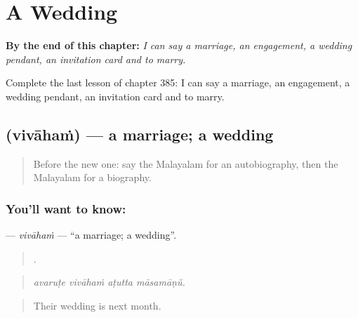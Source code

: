 
\chapter{A Wedding}
\label{ch:ml-a-wedding}

\begin{chapteropening}
\textbf{By the end of this chapter:} \emph{I can say a marriage, an engagement, a wedding pendant, an invitation card and to marry.}

Complete the last lesson of chapter 385: I can say a marriage, an engagement, a wedding pendant, an invitation card and to marry.
\end{chapteropening}

\section[\texorpdfstring{\ml{വിവാഹം} (vivāhaṁ)}{വിവാഹം (vivāhaṁ)}]{ (vivāhaṁ) — a marriage; a wedding}

\label{lesson:ML-C385-vivaham}



\begin{quote}
Before the new one: say the Malayalam for an autobiography, then the Malayalam for a biography.
\end{quote}

\subsection*{You'll want to know: }
\textbf{} — \emph{vivāhaṁ} — \textquotedblleft{}a marriage; a wedding\textquotedblright{}.

\begin{quote}
   .
\end{quote}

\begin{quote}
\emph{avaruṭe vivāhaṁ aṭutta māsamāṇŭ.}
\end{quote}

\begin{quote}
Their wedding is next month.
\end{quote}

